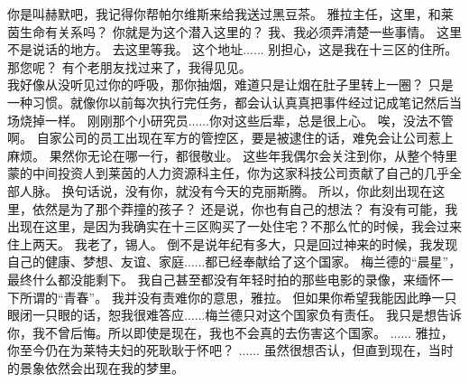 \documentclass[openany]{book}
\begin{document}
\begin{dialogue}
     你是叫赫默吧，我记得你帮帕尔维斯来给我送过黑豆茶。
     雅拉主任，这里，和莱茵生命有关系吗？
     你就是为这个潜入这里的？
     我、我必须弄清楚一些事情。
     这里不是说话的地方。
     去这里等我。
     这个地址......
     别担心，这是我在十三区的住所。
     那您呢？
     有个老朋友找过来了，我得见见。
    \\
     我好像从没听见过你的呼吸，那你抽烟，难道只是让烟在肚子里转上一圈？
     只是一种习惯。就像你以前每次执行完任务，都会认认真真把事件经过记成笔记然后当场烧掉一样。
     刚刚那个小研究员......你对这些后辈，总是很上心。
     唉，没法不管啊。
     自家公司的员工出现在军方的管控区，要是被逮住的话，难免会让公司惹上麻烦。
     果然你无论在哪一行，都很敬业。
     这些年我偶尔会关注到你，从整个特里蒙的中间投资人到莱茵的人力资源科主任，你为这家科技公司贡献了自己的几乎全部人脉。
     换句话说，没有你，就没有今天的克丽斯腾。
     所以，你此刻出现在这里，依然是为了那个莽撞的孩子？
     还是说，你也有自己的想法？
     有没有可能，我出现在这里，是因为我确实在十三区购买了一处住宅？不那么忙的时候，我会过来住上两天。
     我老了，锡人。
     倒不是说年纪有多大，只是回过神来的时候，我发现自己的健康、梦想、友谊、家庭......都已经奉献给了这个国家。
     梅兰德的“晨星”，最终什么都没能剩下。
     我自己甚至都没有年轻时拍的那些电影的录像，来缅怀一下所谓的“青春”。
     我并没有责难你的意思，雅拉。
     但如果你希望我能因此睁一只眼闭一只眼的话，恕我很难答应......梅兰德只对这个国家负有责任。
     我只是想告诉你，我不曾后悔。所以即使是现在，我也不会真的去伤害这个国家。
     ......
     雅拉，你至今仍在为莱特夫妇的死耿耿于怀吧？
     ......
     虽然很想否认，但直到现在，当时的景象依然会出现在我的梦里。
\end{dialogue}
\end{document}
